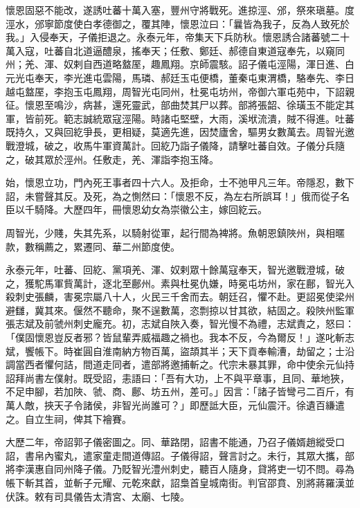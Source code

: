 \begin{pinyinscope}
 懷恩固惡不能改，遂誘吐蕃十萬入塞，豐州守將戰死。進掠涇、邠，祭來瑱墓。度涇水，邠寧節度使白孝德御之，覆其陣，懷恩泣曰：「曩皆為我子，反為人致死於我。」入侵奉天，子儀拒退之。永泰元年，帝集天下兵防秋。懷恩誘合諸蕃號二十萬入寇，吐蕃自北道逼醴泉，搖奉天；任敷、鄭廷、郝德自東道寇奉先，以窺同州；羌、渾、奴剌自西道略盩厔，趣鳳翔。京師震駭。詔子儀屯涇陽，渾日進、白元光屯奉天，李光進屯雲陽，馬璘、郝廷玉屯便橋，董秦屯東渭橋，駱奉先、李日越屯盩厔，李抱玉屯鳳翔，周智光屯同州，杜冕屯坊州，帝御六軍屯苑中，下詔親征。懷恩至鳴沙，病甚，還死靈武，部曲焚其尸以葬。部將張韶、徐璜玉不能定其軍，皆前死。範志誠統眾寇涇陽。時諸屯堅壁，大雨，溪垘流潰，賊不得進。吐蕃既持久，又與回紇爭長，更相疑，莫適先進，因焚廬舍，驅男女數萬去。周智光邀戰澄城，破之，收馬牛軍資萬計。回紇乃詣子儀降，請擊吐蕃自效。子儀分兵隨之，破其眾於涇州。任敷走，羌、渾詣李抱玉降。



 始，懷恩立功，門內死王事者四十六人。及拒命，士不弛甲凡三年。帝隱忍，數下詔，未嘗聲其反。及死，為之惻然曰：「懷恩不反，為左右所誤耳！」俄而從子名臣以千騎降。大歷四年，冊懷恩幼女為崇徽公主，嫁回紇云。



 周智光，少賤，失其先系，以騎射從軍，起行間為裨將。魚朝恩鎮陜州，與相暱款，數稱薦之，累遷同、華二州節度使。



 永泰元年，吐蕃、回紇、黨項羌、渾、奴剌眾十餘萬寇奉天，智光邀戰澄城，破之，獲駝馬軍貲萬計，逐北至鄜州。素與杜冕仇嫌，時冕屯坊州，家在鄜，智光入殺刺史張麟，害冕宗屬八十人，火民三千舍而去。朝廷召，懼不赴。更詔冕使梁州避讎，冀其來。偃然不聽命，聚不逞數萬，恣剽掠以甘其欲，結固之。殺陜州監軍張志斌及前虢州刺史龐充。初，志斌自陜入奏，智光慢不為禮，志斌責之，怒曰：「僕固懷恩豈反者邪？皆鼠輩弄威福趣之禍也。我本不反，今為爾反！」遂叱斬志斌，饗帳下。時崔圓自淮南納方物百萬，盜頡其半；天下貢奉輸漕，劫留之；士沿調當西者懼何詰，間道走同者，遣部將邀捕斬之。代宗未暴其罪，命中使余元仙持詔拜尚書左僕射。既受詔，恚語曰：「吾有大功，上不與平章事，且同、華地狹，不足申腳，若加陜、虢、商、鄜、坊五州，差可。」因言：「諸子皆彎弓二百斤，有萬人敵，挾天子令諸侯，非智光尚誰可？」即歷詆大臣，元仙震汗。徐遺百縑遣之。自立生祠，俾其下襘賽。



 大歷二年，帝詔郭子儀密圖之。同、華路閉，詔書不能通，乃召子儀婿趙縱受口詔，書帛內蜜丸，遣家童走間道傳詔。子儀得詔，聲言討之。未行，其眾大攜，部將李漢惠自同州降子儀。乃貶智光澧州刺史，聽百人隨身，貸將吏一切不問。尋為帳下斬其首，並斬子元耀、元乾來獻，詔梟首皇城南街。判官邵賁、別將蔣羅漢並伏誅。敕有司具儀告太清宮、太廟、七陵。




\end{pinyinscope}
